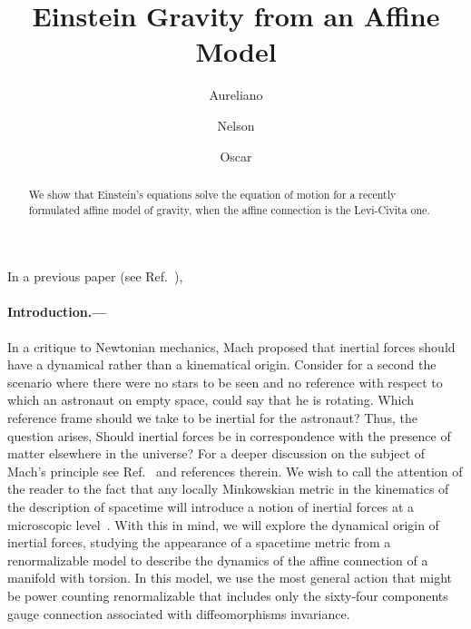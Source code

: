 \documentclass[twocolumn,aps,showpacs,showkeys,prl,superscriptaddress]{revtex4-1}
\begin{document}
\title{Einstein Gravity from an Affine Model}


\author{Aureliano }

\author{Nelson }

\author{Oscar }

\begin{abstract}
  We show that Einstein's equations solve the equation of motion for a recently formulated affine model of gravity, when the affine connection is the Levi-Civita one.
\end{abstract}



\maketitle

In a previous paper (see Ref.~\cite{Skirzewski:2014eta}), 


\paragraph{Introduction.---}
In a critique to Newtonian mechanics, Mach proposed that inertial forces should have a dynamical rather than a kinematical origin. Consider for a second the scenario where there were no stars to be seen and no reference with respect to which an astronaut on empty space, could say that he is rotating. Which reference frame should we take to be inertial for the astronaut?  Thus, the question arises, Should inertial forces  be in correspondence with the presence of matter elsewhere in the universe? For a deeper discussion on the subject of Mach's principle see Ref.~\cite{Lichtenegger:2004re} and references therein.  We wish to call the attention of the reader to the fact that any locally Minkowskian metric in the kinematics of the description of spacetime will introduce a notion of inertial forces at a microscopic level~\cite{Sciama:1964wt}. With this in mind, we will explore the dynamical origin of inertial forces, studying the appearance of a spacetime metric from a renormalizable model to describe the dynamics of the affine connection of a manifold with torsion. In this model, we use the most general action that might be power counting renormalizable that includes only the sixty-four components gauge connection associated with diffeomorphisms invariance.
\end{document}
